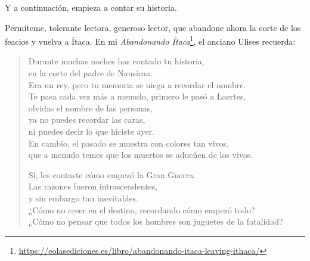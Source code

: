\documentclass[11pt,a4paper]{article}
\begin{document}
Y a continuación, empieza a contar su historia.

Permíteme, tolerante lectora, generoso lector, que abandone ahora la corte de los feacios y vuelva a Ítaca. En mi \emph{Abandonando Ítaca}\footnote{\url{https://eolasediciones.es/libro/abandonando-itaca-leaving-ithaca/}}, el anciano Ulises recuerda:


\begin{verse}
Durante muchas noches has contado tu historia,\\
en la corte del padre de Nausícaa.\\
Era un rey, pero tu memoria se niega a recordar el nombre.\\
Te pasa cada vez más a menudo, primero le pasó a Laertes,\\
olvidas el nombre de las personas,\\
ya no puedes recordar las caras,\\
ni puedes decir lo que hiciste ayer.\\
En cambio, el pasado se muestra con colores tan vivos,\\
que a menudo temes que los muertos se adueñen de los vivos.

Sí, les contaste cómo empezó la Gran Guerra.\\
Las razones fueron intrascendentes,\\
y sin embargo tan inevitables.\\
¿Cómo no creer en el destino, recordando cómo empezó todo?\\
¿Cómo no pensar que todos los hombres son juguetes de la fatalidad?
\end{verse}
\end{document}
